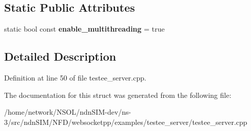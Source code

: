 \subsection*{Static Public Attributes}
\begin{DoxyCompactItemize}
\item 
static bool const {\bfseries enable\+\_\+multithreading} = true\hypertarget{structtestee__config_1_1transport__config_a634fbd34a857da1884aaad2139ae6890}{}\label{structtestee__config_1_1transport__config_a634fbd34a857da1884aaad2139ae6890}

\end{DoxyCompactItemize}


\subsection{Detailed Description}


Definition at line 50 of file testee\+\_\+server.\+cpp.



The documentation for this struct was generated from the following file\+:\begin{DoxyCompactItemize}
\item 
/home/network/\+N\+S\+O\+L/ndn\+S\+I\+M-\/dev/ns-\/3/src/ndn\+S\+I\+M/\+N\+F\+D/websocketpp/examples/testee\+\_\+server/testee\+\_\+server.\+cpp\end{DoxyCompactItemize}

